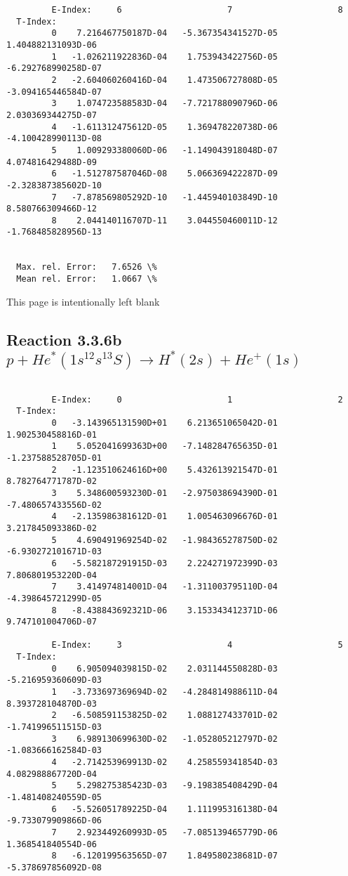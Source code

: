 \documentclass[12pt,dvipdfmx]{article}
\begin{document}
{\begin{small}
\begin{verbatim}
         E-Index:     6                     7                     8
  T-Index:
         0    7.216467750187D-04   -5.367354341527D-05    1.404882131093D-06
         1   -1.026211922836D-04    1.753943422756D-05   -6.292768990258D-07
         2   -2.604060260416D-04    1.473506727808D-05   -3.094165446584D-07
         3    1.074723588583D-04   -7.721788090796D-06    2.030369344275D-07
         4   -1.611312475612D-05    1.369478220738D-06   -4.100428990113D-08
         5    1.009293380060D-06   -1.149043918048D-07    4.074816429488D-09
         6   -1.512787587046D-08    5.066369422287D-09   -2.328387385602D-10
         7   -7.878569805292D-10   -1.445940103849D-10    8.580766309466D-12
         8    2.044140116707D-11    3.044550460011D-12   -1.768485828956D-13


  Max. rel. Error:   7.6526 \%
  Mean rel. Error:   1.0667 \%
\end{verbatim}\end{small}

\newpage
This page is intentionally left blank
\newpage

\subsection{
Reaction 3.3.6b   $p + He^*(1s^12s^13S) \rightarrow H^*(2s) + He^+(1s) $
}


\begin{small}\begin{verbatim}

         E-Index:     0                     1                     2
  T-Index:
         0   -3.143965131590D+01    6.213651065042D-01    1.902530458816D-01
         1    5.052041699363D+00   -7.148284765635D-01   -1.237588528705D-01
         2   -1.123510624616D+00    5.432613921547D-01    8.782764771787D-02
         3    5.348600593230D-01   -2.975038694390D-01   -7.480657433556D-02
         4   -2.135986381612D-01    1.005463096676D-01    3.217845093386D-02
         5    4.690491969254D-02   -1.984365278750D-02   -6.930272101671D-03
         6   -5.582187291915D-03    2.224271972399D-03    7.806801953220D-04
         7    3.414974814001D-04   -1.311003795110D-04   -4.398645721299D-05
         8   -8.438843692321D-06    3.153343412371D-06    9.747101004706D-07

         E-Index:     3                     4                     5
  T-Index:
         0    6.905094039815D-02    2.031144550828D-03   -5.216959360609D-03
         1   -3.733697369694D-02   -4.284814988611D-04    8.393728104870D-03
         2   -6.508591153825D-02    1.088127433701D-02   -1.741996511515D-03
         3    6.989130699630D-02   -1.052805212797D-02   -1.083666162584D-03
         4   -2.714253969913D-02    4.258559341854D-03    4.082988867720D-04
         5    5.298275385423D-03   -9.198385408429D-04   -1.481408240559D-05
         6   -5.526051789225D-04    1.111995316138D-04   -9.733079909866D-06
         7    2.923449260993D-05   -7.085139465779D-06    1.368541840554D-06
         8   -6.120199563565D-07    1.849580238681D-07   -5.378697856092D-08


\end{verbatim}
\end{small}}
\end{document}
